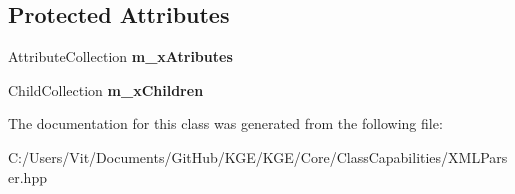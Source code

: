 \subsection*{Protected Attributes}
\begin{DoxyCompactItemize}
\item 
\hypertarget{class_k_g_e_1_1_x_m_l_parser_aa2d7ff6c80ffbc8559ff707d056720cb}{Attribute\-Collection {\bfseries m\-\_\-x\-Atributes}}\label{class_k_g_e_1_1_x_m_l_parser_aa2d7ff6c80ffbc8559ff707d056720cb}

\item 
\hypertarget{class_k_g_e_1_1_x_m_l_parser_a79fde2a76d5373cbfea6f2acd983fd25}{Child\-Collection {\bfseries m\-\_\-x\-Children}}\label{class_k_g_e_1_1_x_m_l_parser_a79fde2a76d5373cbfea6f2acd983fd25}

\end{DoxyCompactItemize}


The documentation for this class was generated from the following file\-:\begin{DoxyCompactItemize}
\item 
C\-:/\-Users/\-Vit/\-Documents/\-Git\-Hub/\-K\-G\-E/\-K\-G\-E/\-Core/\-Class\-Capabilities/X\-M\-L\-Parser.\-hpp\end{DoxyCompactItemize}
